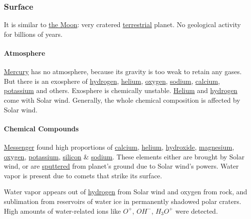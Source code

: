\subsubsection{Surface}
It is similar to \hyperref[planet:earth:moon]{the Moon}: very cratered
\href{https://en.wikipedia.org/wiki/Terrestrial_planet}{terrestrial} planet. No
geological activity for billions of years.
\paragraph{Atmosphere}
\hyperref[planet:mercury]{Mercury} has no atmosphere, because its gravity is too
weak to retain any gases. But there is an exosphere of
\href{https://en.wikipedia.org/wiki/Hydrogen}{hydrogen},
\href{https://en.wikipedia.org/wiki/Helium}{helium},
\href{https://en.wikipedia.org/wiki/Oxygen}{oxygen},
\href{https://en.wikipedia.org/wiki/Sodium}{sodium},
\href{https://en.wikipedia.org/wiki/Calcium}{calcium},
\href{https://en.wikipedia.org/wiki/Potassium}{potassium} and others. Exosphere
is chemically unstable. \href{https://en.wikipedia.org/wiki/Helium}{Helium} and
\href{https://en.wikipedia.org/wiki/Hydrogen}{hydrogen} come with Solar wind.
Generally, the whole chemical composition is affected by Solar wind.
\paragraph{Chemical Compounds}
\hyperref[planet:mercury:spacecraft]{Messenger} found high proportions of
\href{https://en.wikipedia.org/wiki/Calcium}{calcium},
\href{https://en.wikipedia.org/wiki/Helium}{helium},
\href{https://en.wikipedia.org/wiki/Hydroxide}{hydroxide},
\href{https://en.wikipedia.org/wiki/Magnesium}{magnesium},
\href{https://en.wikipedia.org/wiki/Oxygen}{oxygen},
\href{https://en.wikipedia.org/wiki/Potassium}{potassium},
\href{https://en.wikipedia.org/wiki/Silicon}{silicon} \&
\href{https://en.wikipedia.org/wiki/Sodium}{sodium}. These elements either are
brought by Solar wind, or are
\href{https://en.wikipedia.org/wiki/Silicon}{sputtered} from planet's ground
due to Solar wind's powers. Water vapor is present due to comets that strike its
surface.

Water vapor appears out of
\href{https://en.wikipedia.org/wili/Hydrogen}{hydrogen} from Solar wind and
oxygen from rock, and sublimation from reservoirs of water ice in permanently
shadowed polar craters. High amounts of water-related ions like $O^+$, $OH^-$,
\href{https://en.wikipedia.org/wiki/Hydronium}{$H_3O^+$} were detected.

